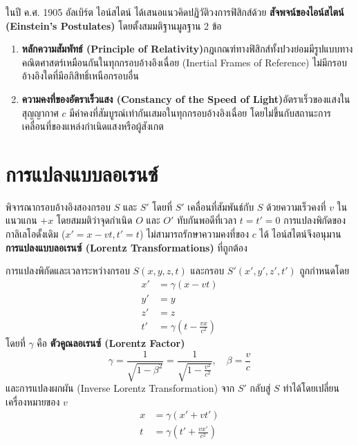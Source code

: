 ในปี ค.ศ. 1905 อัลเบิร์ต ไอน์สไตน์ ได้เสนอแนวคิดปฏิวัติวงการฟิสิกส์ด้วย \textbf{สัจพจน์ของไอน์สไตน์ (Einstein's Postulates)} โดยตั้งสมมติฐานมูลฐาน 2 ข้อ

\begin{mathdefinition}
\begin{enumerate}
    \item \textbf{หลักความสัมพัทธ์ (Principle of Relativity)}\quad กฎเกณฑ์ทางฟิสิกส์ทั้งปวงย่อมมีรูปแบบทางคณิตศาสตร์เหมือนกันในทุกกรอบอ้างอิงเฉื่อย (Inertial Frames of Reference) ไม่มีกรอบอ้างอิงใดที่มีอภิสิทธิ์เหนือกรอบอื่น
    \item \textbf{ความคงที่ของอัตราเร็วแสง (Constancy of the Speed of Light)}\quad อัตราเร็วของแสงในสุญญากาศ $c$ มีค่าคงที่สัมบูรณ์เท่ากันเสมอในทุกกรอบอ้างอิงเฉื่อย โดยไม่ขึ้นกับสถานะการเคลื่อนที่ของแหล่งกำเนิดแสงหรือผู้สังเกต
\end{enumerate}
\end{mathdefinition}

\section{การแปลงแบบลอเรนซ์}

พิจารณากรอบอ้างอิงสองกรอบ $S$ และ $S'$ โดยที่ $S'$ เคลื่อนที่สัมพันธ์กับ $S$ ด้วยความเร็วคงที่ $v$ ในแนวแกน $+x$ โดยสมมติว่าจุดกำเนิด $O$ และ $O'$ ทับกันพอดีที่เวลา $t = t' = 0$ การแปลงพิกัดของกาลิเลโอดั้งเดิม ($x' = x - vt, t' = t$) ไม่สามารถรักษาความคงที่ของ $c$ ได้ ไอน์สไตน์จึงอนุมาน \textbf{การแปลงแบบลอเรนซ์ (Lorentz Transformations)} ที่ถูกต้อง

\begin{maththeorem}[สมการการแปลงแบบลอเรนซ์]
การแปลงพิกัดและเวลาระหว่างกรอบ $S(x, y, z, t)$ และกรอบ $S'(x', y', z', t')$ ถูกกำหนดโดย
\begin{align}
x' &= \gamma (x - vt) \\
y' &= y \\
z' &= z \\
t' &= \gamma \left( t - \frac{vx}{c^2} \right)
\end{align}
โดยที่ $\gamma$ คือ \textbf{ตัวคูณลอเรนซ์ (Lorentz Factor)}
\begin{equation}
\gamma = \frac{1}{\sqrt{1 - \beta^2}} = \frac{1}{\sqrt{1 - \frac{v^2}{c^2}}}, \quad \beta = \frac{v}{c}
\end{equation}
และการแปลงผกผัน (Inverse Lorentz Transformation) จาก $S'$ กลับสู่ $S$ ทำได้โดยเปลี่ยนเครื่องหมายของ $v$
\begin{align}
x &= \gamma (x' + vt') \\
t &= \gamma \left( t' + \frac{vx'}{c^2} \right)
\end{align}
\end{maththeorem}

